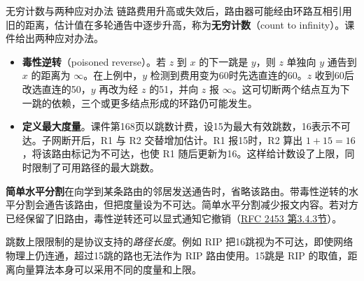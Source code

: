 \begin{proposition}{无穷计数与两种应对办法}
链路费用升高或失效后，路由器可能经由环路互相引用旧的距离，估计值在多轮通告中逐步升高，称为\textbf{无穷计数}（count to infinity）。课件给出两种应对办法。
\begin{itemize}[nosep]
  \item \textbf{毒性逆转}（poisoned reverse）。若 $z$ 到 $x$ 的下一跳是 $y$，则 $z$ 单独向 $y$ 通告到 $x$ 的距离为 $\infty$。在上例中，$y$ 检测到费用变为60时先选直连的60。$z$ 收到60后改选直连的50，$y$ 再改为经 $z$ 的51，并向 $z$ 报 $\infty$。这可切断两个结点互为下一跳的依赖，三个或更多结点形成的环路仍可能发生。
  \item \textbf{定义最大度量}。课件第168页以跳数计费，设15为最大有效跳数，16表示不可达。子网断开后，R1 与 R2 交替增加估计。R1 报15时，R2 算出 $1+15=16$，将该路由标记为不可达，也使 R1 随后更新为16。这样给计数设了上限，同时限制了可用路径的最大跳数。
\end{itemize}
\end{proposition}
\begin{remark}
  \textbf{简单水平分割}在向学到某条路由的邻居发送通告时，省略该路由。带毒性逆转的水平分割会通告该路由，但把度量设为不可达。简单水平分割减少报文内容。若对方已经保留了旧路由，毒性逆转还可以显式通知它撤销（\href{https://www.rfc-editor.org/rfc/rfc2453.html\#section-3.4.3}{RFC 2453 第3.4.3节}）。
\end{remark}
\begin{remark}
  跳数上限限制的是协议支持的\emph{路径长度}。例如 RIP 把16跳视为不可达，即使网络物理上仍连通，超过15跳的路也无法作为 RIP 路由使用。15跳是 RIP 的取值，距离向量算法本身可以采用不同的度量和上限。
\end{remark}

\newpage
